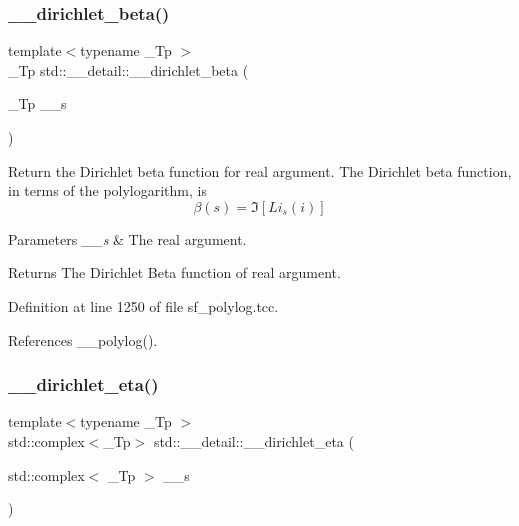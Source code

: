 \subsubsection{\texorpdfstring{\+\_\+\+\_\+dirichlet\+\_\+beta()}{\_\_dirichlet\_beta()}\hspace{0.1cm}{\footnotesize\ttfamily [2/2]}}
{\footnotesize\ttfamily template$<$typename \+\_\+\+Tp $>$ \\
\+\_\+\+Tp std\+::\+\_\+\+\_\+detail\+::\+\_\+\+\_\+dirichlet\+\_\+beta (\begin{DoxyParamCaption}\item[{\+\_\+\+Tp}]{\+\_\+\+\_\+s }\end{DoxyParamCaption})}

Return the Dirichlet beta function for real argument. The Dirichlet beta function, in terms of the polylogarithm, is \[ \beta(s) = \Im[Li_s(i)] \]


\begin{DoxyParams}{Parameters}
{\em \+\_\+\+\_\+s} & The real argument. \\
\hline
\end{DoxyParams}
\begin{DoxyReturn}{Returns}
The Dirichlet Beta function of real argument. 
\end{DoxyReturn}


Definition at line 1250 of file sf\+\_\+polylog.\+tcc.



References \+\_\+\+\_\+polylog().

\mbox{\label{namespacestd_1_1____detail_a3d8d694bf430ca3959c9e6b00c332468}} 
\subsubsection{\texorpdfstring{\+\_\+\+\_\+dirichlet\+\_\+eta()}{\_\_dirichlet\_eta()}\hspace{0.1cm}{\footnotesize\ttfamily [1/2]}}
{\footnotesize\ttfamily template$<$typename \+\_\+\+Tp $>$ \\
std\+::complex$<$\+\_\+\+Tp$>$ std\+::\+\_\+\+\_\+detail\+::\+\_\+\+\_\+dirichlet\+\_\+eta (\begin{DoxyParamCaption}\item[{std\+::complex$<$ \+\_\+\+Tp $>$}]{\+\_\+\+\_\+s }\end{DoxyParamCaption})}

